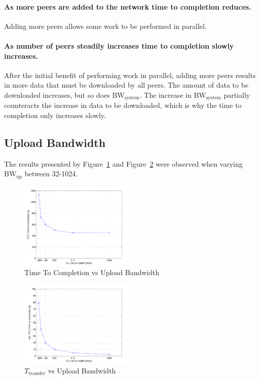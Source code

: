 \documentclass[a4paper,12pt,twocolumn]{article}
\newcommand{\fref}[1]{Figure~\ref{#1}}
\begin{document}
\paragraph{As more peers are added to the network time to completion reduces.} Adding more peers allows some work to be performed in parallel.

\paragraph{As number of peers steadily increases time to completion slowly increases.}
After the initial benefit of performing work in parallel, adding more peers results in more data that must be downloaded by all peers. The amount of data to be downloaded increases, but so does $\text{BW}_{\text{system}}$. The increase in $\text{BW}_{\text{system}}$ partially counteracts the increase in data to be downloaded, which is why the time to completion only increases slowly.

\subsection{Upload Bandwidth}
\label{subsec:upload_bandwidth_results}

The results presented by \fref{fig:upload_bandwidth_ttc} and \fref{fig:upload_bandwidth_ttransfer} were observed when varying $\text{BW}_{\text{up}}$ between 32-1024.

\begin{figure}[!htbp]
  \centering
  \includegraphics[width=0.49\textwidth]{figs/Experiment3_TTC}
  \caption{Time To Completion vs Upload Bandwidth}
  \label{fig:upload_bandwidth_ttc}
\end{figure}

\begin{figure}[!htbp]
  \centering
  \includegraphics[width=0.49\textwidth]{figs/Experiment3_min_TTC}
  \caption{$T_{\text{transfer}}$ vs Upload Bandwidth}
  \label{fig:upload_bandwidth_ttransfer}
\end{figure}
\end{document}
